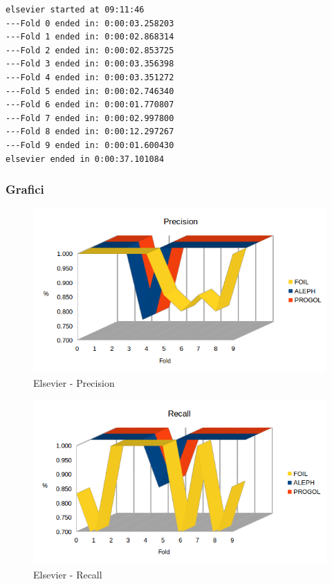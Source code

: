 \begin{verbatim}
elsevier started at 09:11:46
---Fold 0 ended in: 0:00:03.258203
---Fold 1 ended in: 0:00:02.868314
---Fold 2 ended in: 0:00:02.853725
---Fold 3 ended in: 0:00:03.356398
---Fold 4 ended in: 0:00:03.351272
---Fold 5 ended in: 0:00:02.746340
---Fold 6 ended in: 0:00:01.770807
---Fold 7 ended in: 0:00:02.997800
---Fold 8 ended in: 0:00:12.297267
---Fold 9 ended in: 0:00:01.600430
elsevier ended in 0:00:37.101084
\end{verbatim}

\subsubsection{Grafici}
\begin{figure}[H]
	\includegraphics[width=1.1\textwidth]{img/datasetGraph/elsevier/precision.png}
	\caption{Elsevier - Precision}
	\label{Elsevier-Precision}
\end{figure}

\begin{figure}[H]
	\includegraphics[width=1.1\textwidth]{img/datasetGraph/elsevier/recall.png}
	\caption{Elsevier - Recall}
	\label{Elsevier-Recall}
\end{figure}

